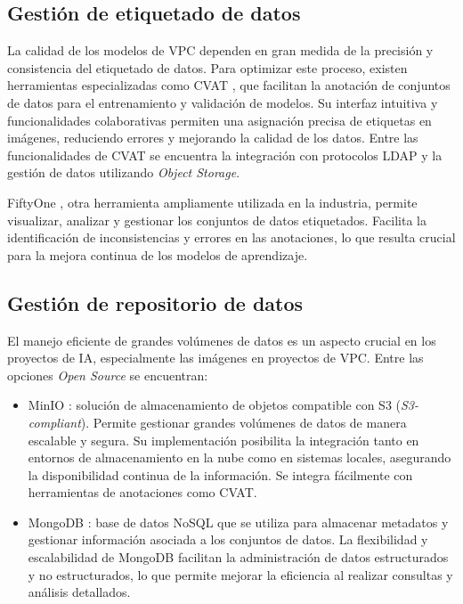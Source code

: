 \subsection{Gestión de etiquetado de datos}

La calidad de los modelos de VPC dependen en gran medida de la precisión y consistencia del etiquetado de datos. Para optimizar este proceso, existen herramientas especializadas como CVAT \citep{sekachev_opencvcvat_2020}, que facilitan la anotación de conjuntos de datos para el entrenamiento y validación de modelos. Su interfaz intuitiva y funcionalidades colaborativas permiten una asignación precisa de etiquetas en imágenes, reduciendo errores y mejorando la calidad de los datos. Entre las funcionalidades de CVAT se encuentra la integración con protocolos LDAP y la gestión de datos utilizando \textit{Object Storage}.

FiftyOne \citep{moore_fiftyone_2020}, otra herramienta ampliamente utilizada en la industria, permite visualizar, analizar y gestionar los conjuntos de datos etiquetados. Facilita la identificación de inconsistencias y errores en las anotaciones, lo que resulta crucial para la mejora continua de los modelos de aprendizaje.

\subsection{Gestión de repositorio de datos}

El manejo eficiente de grandes volúmenes de datos es un aspecto crucial en los proyectos de IA, especialmente las imágenes en proyectos de VPC. Entre las opciones \textit{Open Source} se encuentran:

\begin{itemize}
	\item MinIO \citep{minio_inc_minio_2023}: solución de almacenamiento de objetos compatible con S3 \citep{amazon_amazon_2024} (\textit{S3-compliant}). Permite gestionar grandes volúmenes de datos de manera escalable y segura. Su implementación posibilita la integración tanto en entornos de almacenamiento en la nube como en sistemas locales, asegurando la disponibilidad continua de la información. Se integra fácilmente con herramientas de anotaciones como CVAT.
	\item MongoDB \citep{mongodb_inc_mongodb_2023}: base de datos NoSQL que se utiliza para almacenar metadatos y gestionar información asociada a los conjuntos de datos. La flexibilidad y escalabilidad de MongoDB facilitan la administración de datos estructurados y no estructurados, lo que permite mejorar la eficiencia al realizar consultas y análisis detallados.
\end{itemize}


